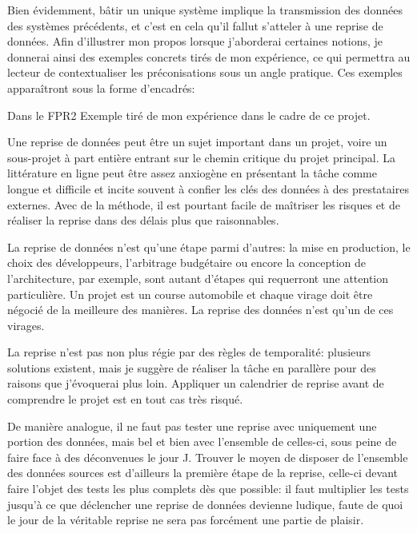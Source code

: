 \documentclass{book}
\begin{document}
Bien évidemment, bâtir un unique système implique la transmission des données des systèmes précédents, et c'est en cela qu'il fallut s'atteler à une reprise de données. Afin d'illustrer mon propos lorsque j'aborderai certaines notions, je donnerai ainsi des exemples concrets tirés de mon expérience, ce qui permettra au lecteur de contextualiser les préconisations sous un angle pratique. Ces exemples apparaîtront sous la forme d'encadrés:

\begin{bclogo}[arrondi = 0.1, couleur = blue!10, logo = \bcinfo]{Dans le FPR2}
Exemple tiré de mon expérience dans le cadre de ce projet.
\end{bclogo}

Une reprise de données peut être un sujet important dans un projet, voire un sous-projet à part entière entrant sur le chemin critique du projet principal. La littérature en ligne peut être assez anxiogène en présentant la tâche comme longue et difficile et incite souvent à confier les clés des données à des prestataires externes. Avec de la méthode, il est pourtant facile de maîtriser les risques et de réaliser la reprise dans des délais plus que raisonnables.

\medbreak

La reprise de données n'est qu'une étape parmi d'autres: la mise en production, le choix des développeurs, l'arbitrage budgétaire ou encore la conception de l'architecture, par exemple, sont autant d'étapes qui requerront une attention particulière. Un projet est un course automobile et chaque virage doit être négocié de la meilleure des manières. La reprise des données n'est qu'un de ces virages.

La reprise n'est pas non plus régie par des règles de temporalité: plusieurs solutions existent, mais je suggère de réaliser la tâche en parallère pour des raisons que j'évoquerai plus loin. Appliquer un calendrier de reprise avant de comprendre le projet est en tout cas très risqué.

De manière analogue, il ne faut pas tester une reprise avec uniquement une portion des données, mais bel et bien avec l'ensemble de celles-ci, sous peine de faire face à des déconvenues le jour J. Trouver le moyen de disposer de l'ensemble des données sources est d'ailleurs la première étape de la reprise, celle-ci devant faire l'objet des tests les plus complets dès que possible: il faut multiplier les tests jusqu'à ce que déclencher une reprise de données devienne ludique, faute de quoi le jour de la véritable reprise ne sera pas forcément une partie de plaisir.
\end{document}
